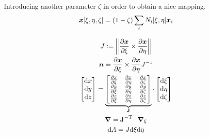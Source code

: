 \documentclass[a4paper,11pt]{article}
\renewcommand{\to}[1]{\text{\boldmath $#1$}} %
\newcommand{\ts}[1]{\text{\boldmath $\mathrm{#1}$}} %
\newcommand{\intd}[1]{\mathrm{d}#1}
\newcommand{\pderiv}[2]{\frac{\partial#1}{\partial#2}}
\newcommand{\norm}[1]{\left\lVert{#1}\right\rVert}
\newcommand{\T}{\mathrm{T}}
\newcommand{\defeq}{:=}
\begin{document}
Introducing another parameter $\zeta$ in order to obtain a nice mapping.
\begin{align}
 \to x[\xi,\eta,\zeta] = (1-\zeta)\sum_i N_i[\xi,\eta]\to x_i
\end{align}

\begin{gather}
 J \defeq \norm{\pderiv{\to x}{\xi} \times  \pderiv{\to x}{\eta}}\\
 \to n = \pderiv{\to x}{\xi} \times \pderiv{\to x}{\eta} J^{-1}\\
 \begin{bmatrix}\intd x\\ \intd y\\ \intd z\end{bmatrix} =
  \underbrace{\begin{bmatrix}\pderiv{x}{\xi} & \pderiv{x}{\eta} & \pderiv{x}{\zeta}\\
	  \pderiv{y}{\xi} & \pderiv{y}{\eta} & \pderiv{y}{\zeta}\\
	  \pderiv{z}{\xi} & \pderiv{z}{\eta} & \pderiv{z}{\zeta} \end{bmatrix}}_{\ts J}
  \cdot \begin{bmatrix}\intd \xi \\ \intd \eta \\ \intd \zeta\end{bmatrix}\\
 \to\nabla = \ts J^{-\T}\cdot\to\nabla_\xi\\
 \intd A = J \intd \xi \intd \eta 
\end{gather}


\end{document}
